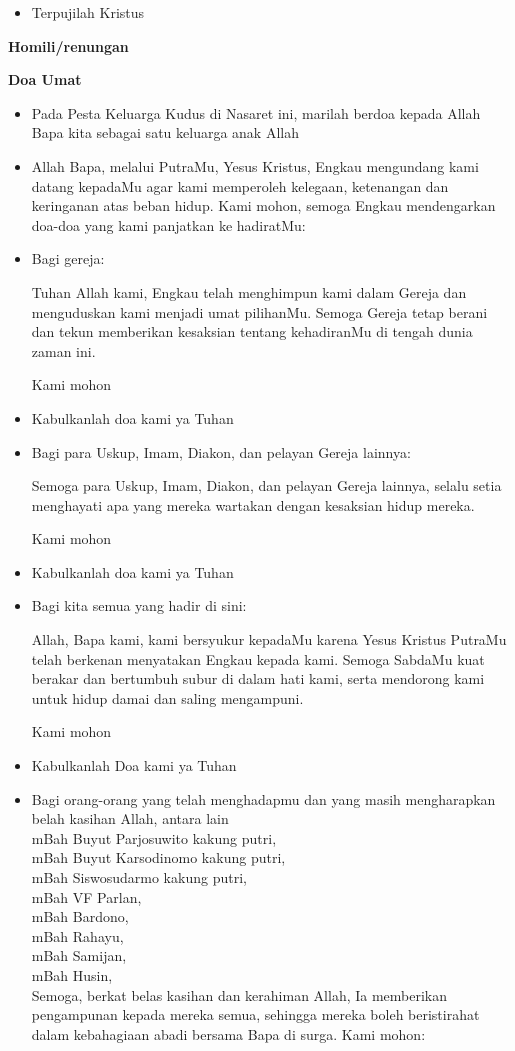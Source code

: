 \documentclass[a5paper,12pt,openany]{scrbook}
\makeatletter
\newcommand{\subjudul}[1]{%
  {\parindent \z@ \normalfont
    \interlinepenalty\@M \bfseries #1\par\nobreak \vskip 20\p@ }}
\newcommand{\BU}[1]{\begin{itemize} \item[U:] #1 \end{itemize}}
\newcommand{\BP}[1]{\begin{itemize} \item[P:] #1 \end{itemize}}
\makeatother
\begin{document}
\BU{Terpujilah Kristus}


\subjudul{Homili/renungan}


\subjudul{Doa Umat}

\BP{Pada Pesta Keluarga Kudus di Nasaret ini, marilah berdoa kepada Allah Bapa kita sebagai satu keluarga anak Allah}

\BP{Allah Bapa, melalui PutraMu, Yesus Kristus, Engkau mengundang kami datang kepadaMu agar kami memperoleh kelegaan, ketenangan dan keringanan atas beban hidup. Kami mohon, semoga Engkau mendengarkan doa-doa yang kami panjatkan ke hadiratMu:}

\BP{Bagi gereja:

Tuhan Allah kami, Engkau telah menghimpun kami dalam Gereja dan menguduskan kami menjadi umat pilihanMu. Semoga Gereja tetap berani dan tekun memberikan kesaksian tentang kehadiranMu di tengah dunia zaman ini.

Kami mohon}

\BU{Kabulkanlah doa kami ya Tuhan}

\BP{Bagi para Uskup, Imam, Diakon, dan pelayan Gereja lainnya:

Semoga para Uskup, Imam, Diakon, dan pelayan Gereja lainnya, selalu setia menghayati apa yang mereka wartakan dengan kesaksian hidup mereka.

Kami mohon}

\BU{Kabulkanlah doa kami ya Tuhan}

\BP{Bagi kita semua yang hadir di sini:

Allah, Bapa kami, kami bersyukur kepadaMu karena Yesus Kristus PutraMu telah berkenan menyatakan Engkau kepada kami. Semoga SabdaMu kuat berakar dan bertumbuh subur di dalam hati kami, serta mendorong kami untuk hidup damai dan saling mengampuni.

Kami mohon}

\BU{Kabulkanlah Doa kami ya Tuhan} 


\BP{Bagi orang-orang yang telah menghadapmu dan
yang masih mengharapkan belah kasihan Allah, antara lain\\
mBah Buyut Parjosuwito kakung putri, \\
mBah Buyut Karsodinomo  kakung putri, \\
mBah Siswosudarmo kakung putri, \\
mBah VF Parlan, \\
mBah Bardono, \\
mBah Rahayu, \\
mBah Samijan, \\
mBah Husin,\\
Semoga, berkat belas kasihan dan kerahiman
Allah, Ia memberikan pengampunan kepada
mereka semua, sehingga mereka boleh beristirahat dalam kebahagiaan abadi bersama Bapa
di surga. Kami mohon:}
\end{document}
